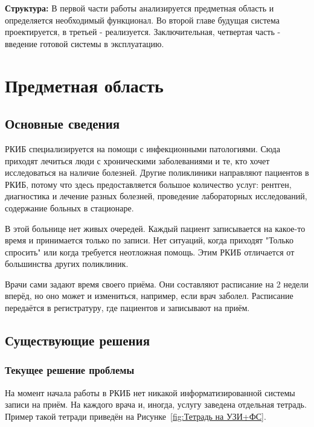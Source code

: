 \documentclass[a4paper,article]{article}
\begin{document}
        \textbf{Структура:} В первой части работы анализируется предметная область и определяется необходимый функционал. Во второй главе будущая система проектируется, в третьей - реализуется. Заключительная, четвертая часть - введение готовой системы в эксплуатацию.

        \newpage

    \section{Предметная область}

    \subsection{Основные сведения}

        РКИБ специализируется на помощи с инфекционными патологиями. Сюда приходят лечиться люди с хроническими заболеваниями и те, кто хочет исследоваться на наличие болезней. Другие поликлиники направляют пациентов в РКИБ, потому что здесь предоставляется большое количество услуг: рентген, диагностика и лечение разных болезней, проведение лабораторных исследований, содержание больных в стационаре.

        В этой больнице нет живых очередей. Каждый пациент записывается на какое-то время и принимается только по записи. Нет ситуаций, когда приходят "Только спросить" или когда требуется неотложная помощь. Этим РКИБ отличается от большинства других поликлиник.

        Врачи сами задают время своего приёма. Они составляют расписание на 2 недели вперёд, но оно может и измениться, например, если врач заболел. Расписание передаётся в регистратуру, где пациентов и записывают на приём.

    \subsection{Существующие решения}

    \subsubsection{Текущее решение проблемы}\label{Текущее решение проблемы}

        На момент начала работы в РКИБ нет никакой информатизированной системы записи на приём. На каждого врача и, иногда, услугу заведена отдельная тетрадь. Пример такой тетради приведён на Рисунке~\ref{fig:Тетрадь на УЗИ+ФС}.
\end{document}

